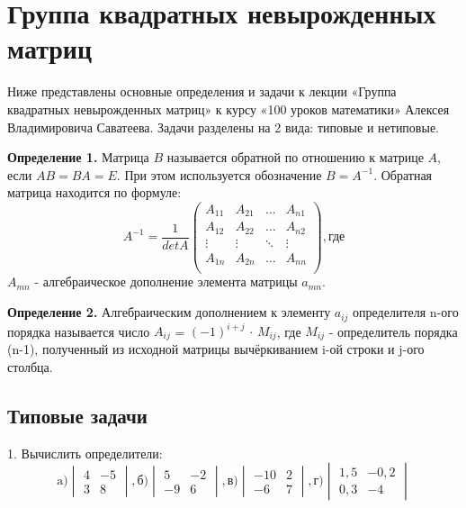 \documentclass[12pt]{article}
\begin{document}
\section*{Группа квадратных невырожденных матриц}
Ниже представлены основные определения и задачи к лекции «Группа квадратных невырожденных матриц» к курсу «100 уроков математики» Алексея Владимировича Саватеева.
Задачи разделены на 2 вида: типовые и нетиповые.

{\bf Определение 1.} Матрица $B$ называется обратной по отношению к матрице $A$, если $AB = BA = E$. При этом используется обозначение $B = A^{-1}$. Обратная матрица находится по формуле:
\[
A^{-1} = \frac{1}{det A}\begin{pmatrix}
A_{11} & A_{21} & \dots & A_{n1}\\
A_{12} & A_{22} & \dots & A_{n2}\\
\vdots & \vdots & \ddots& \vdots\\
A_{1n} & A_{2n} & \dots & A_{nn}\\
\end{pmatrix}, \text{где}
\] $A_{mn}$ - алгебраическое дополнение элемента матрицы $a_{mn}$.

\textbf{Определение 2.} Алгебраическим дополнением к элементу $a_{ij}$ определителя n-ого порядка называется число $A_{ij}$ = $(-1)^{i+j}$ $\cdot$ $M_{ij}$, где $M_{ij}$ - определитель порядка (n-1), полученный из исходной матрицы вычёркиванием i-ой строки и j-ого столбца.

\subsection*{Типовые задачи}
1. Вычислить определители:
\[
\text{a)}
\begin{vmatrix}
4 & -5\\
3 & 8
\end{vmatrix},
\text{б)}
\begin{vmatrix}
5 & -2\\
-9 & 6
\end{vmatrix},
\text{в)}
\begin{vmatrix}
-10 & 2\\
-6 & 7
\end{vmatrix},
\text{г)}
\begin{vmatrix}
1,5 & -0,2\\
0,3 & -4
\end{vmatrix}
\]
\end{document}
